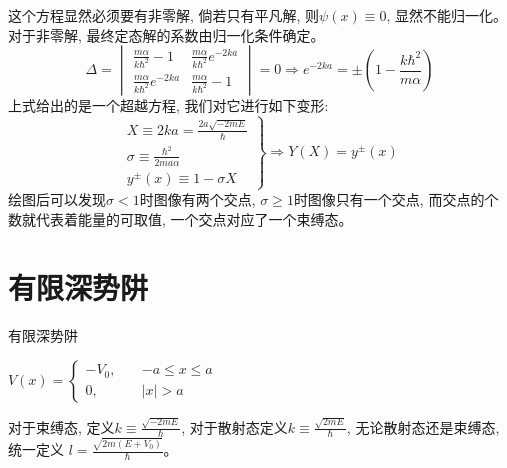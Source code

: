 \documentclass[a4paper,zihao=-4,linespread=1]{ctexrep}
\begin{document}
    这个方程显然必须要有非零解, 倘若只有平凡解, 则$\psi(x)\equiv0$, 显然不能归一化。对于非零解, 最终定态解的系数由归一化条件确定。
    \begin{equation}
        \Delta=\begin{vmatrix}
            \frac{m\alpha}{k\hbar^2}-1&\frac{m\alpha}{k\hbar^2}e^{-2ka}\\
            \frac{m\alpha}{k\hbar^2}e^{-2ka}&\frac{m\alpha}{k\hbar^2}-1
        \end{vmatrix}=0
        \Rightarrow e^{-2ka}=\pm\left(1-\frac{k\hbar^2}{m\alpha}\right)
    \end{equation}
    上式给出的是一个超越方程, 我们对它进行如下变形:
    \begin{equation}
        \left.\begin{matrix} 
           X\equiv 2ka=\frac{2a\sqrt{-2mE}}{\hbar}\\
            \sigma\equiv\frac{\hbar^2}{2ma\alpha}\\
            y^\pm(x) \equiv 1-\sigma X
          \end{matrix}\right\}\Rightarrow Y(X)=y^\pm(x)
    \end{equation}
    绘图后可以发现$\sigma<1$时图像有两个交点, $\sigma\geq 1$时图像只有一个交点, 而交点的个数就代表着能量的可取值, 一个交点对应了一个束缚态。
    \begin{center}  
    \end{center}
    \newpage
    \section{有限深势阱}
    \begin{define}{有限深势阱}
        \begin{center}
            \begin{math}
                \displaystyle
                V(x)=\begin{cases}
                    -V_0,\quad &-a\leq x \leq a\\
                    0, &|x|>a
                \end{cases}
            \end{math}
        \end{center}
    \end{define}
    对于束缚态, 定义$k\equiv\frac{\sqrt{-2mE}}{\hbar}$, 对于散射态定义$k\equiv\frac{\sqrt{2mE}}{\hbar}$, 无论散射态还是束缚态, 统一定义
    $l=\frac{\sqrt{2m\left(E+V_0\right)}}{\hbar}$。
\end{document}
